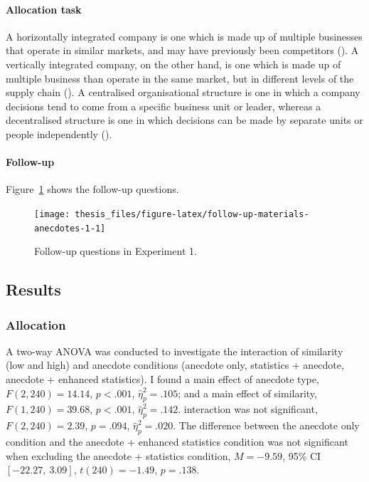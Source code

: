 \documentclass[a4paper, nobind, dvipsnames]{templates/ociamthesis}
\theoremstyle{definition}
\theoremstyle{definition}
\theoremstyle{definition}
\theoremstyle{definition}
\theoremstyle{remark}
\begin{document}
\hypertarget{allocation-materials-anecdotes-1}{%
\paragraph{Allocation task}\label{allocation-materials-anecdotes-1}}

A horizontally integrated company is one which is made up of multiple businesses
that operate in similar markets, and may have previously been competitors
(\textcite{gaughan2012}). A vertically integrated company, on the other hand, is one which
is made up of multiple business than operate in the same market, but in
different levels of the supply chain (\textcite{gaughan2012a}). A centralised
organisational structure is one in which a company decisions tend to come from a
specific business unit or leader, whereas a decentralised structure is one in
which decisions can be made by separate units or people independently
(\textcite{kenton2021}).

\hypertarget{follow-up-materials-anecdotes-1}{%
\paragraph{Follow-up}\label{follow-up-materials-anecdotes-1}}

Figure~\ref{fig:follow-up-materials-anecdotes-1} shows the follow-up questions.



\begin{figure}
\texttt{[image: thesis\_files/figure-latex/follow-up-materials-anecdotes-1-1]} \caption{Follow-up questions in Experiment 1.}\label{fig:follow-up-materials-anecdotes-1}
\end{figure}

\hypertarget{results-anecdotes-1-appendix}{%
\subsection{Results}\label{results-anecdotes-1-appendix}}

\hypertarget{allocation-2}{%
\subsubsection{Allocation}\label{allocation-2}}

A two-way ANOVA was conducted to investigate the interaction of similarity (low
and high) and anecdote conditions (anecdote only, statistics + anecdote,
anecdote + enhanced statistics). I found a main effect of anecdote type,
\(F(2, 240) = 14.14\), \(p < .001\), \(\hat{\eta}^2_p = .105\); and a main effect of similarity,
\(F(1, 240) = 39.68\), \(p < .001\), \(\hat{\eta}^2_p = .142\). interaction was not significant,
\(F(2, 240) = 2.39\), \(p = .094\), \(\hat{\eta}^2_p = .020\). The difference between
the anecdote only condition and the anecdote + enhanced statistics condition was
not significant when excluding the anecdote + statistics condition,
\(M = -9.59\), 95\% CI \([-22.27,~3.09]\), \(t(240) = -1.49\), \(p = .138\).
\end{document}
